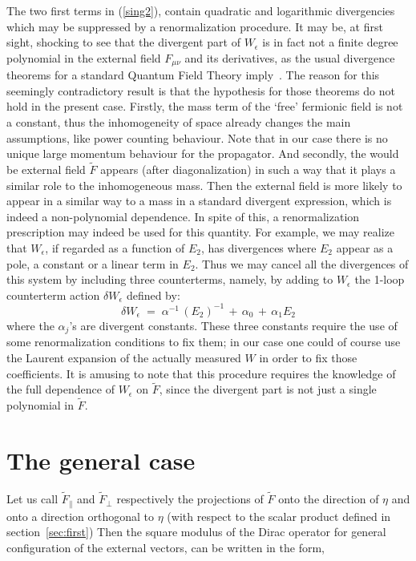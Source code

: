 \documentclass[a4paper,12pt]{article}
\newcommand{\Fd}{\widetilde{F}}
\newcommand{\n}{\eta}
\begin{document}
%

The two first terms in (\ref{sing2}), contain quadratic and
logarithmic divergencies which may be suppressed by a renormalization
procedure. It may be, at first sight, shocking to see that the
divergent part of $W_\epsilon$ is in fact not a finite degree polynomial in
the external field $F_{\mu\nu}$ and its derivatives, as the usual
divergence theorems for a standard Quantum Field Theory
imply~\cite{itzykson}. The reason for this seemingly contradictory
result is that the hypothesis for those theorems do not hold in the
present case. Firstly, the mass term of the `free' fermionic field is
not a constant, thus the inhomogeneity of space already changes the
main assumptions, like power counting behaviour. Note that in our case
there is no unique large momentum behaviour for the propagator.  And
secondly, the would be external field ${\tilde F}$ appears (after
diagonalization) in such a way that it plays a similar role to the
inhomogeneous mass. Then the external field is more likely to appear
in a similar way to a mass in a standard divergent expression, which
is indeed a non-polynomial dependence.
%
In spite of this, a renormalization prescription may indeed be used for this 
quantity. For example, we may realize that $W_\epsilon$, if regarded as a function of 
$E_2$, has divergences where $E_2$ appear as a pole, a constant or a linear term
in $E_2$. Thus we may cancel all the divergences of this system by including
three counterterms, namely, by adding to $W_\epsilon$ the 1-loop counterterm action
$\delta W_\epsilon$ defined by:
\begin{equation}
  \label{counter}
\delta W_\epsilon \;=\; \alpha^{-1} \, (E_2)^{-1} \,+\, \alpha_0 \,+\, \alpha_1 E_2  
\end{equation}   
where the $\alpha_j$'s are divergent constants. These three constants
require the use of some renormalization conditions to fix them; in our
case one could of course use the Laurent expansion of the actually
measured $W$ in order to fix those coefficients. It is amusing to
note that this procedure requires the knowledge of the full dependence
of $W_\epsilon$ on $\tilde{F}$, since the divergent part is not just a single
polynomial in $\tilde{F}$.

\section{The general case}\label{sec:general}
Let us call $\Fd_\|$ and $\Fd_\bot$ respectively the projections of $\Fd$
onto the direction of $\n$ and onto a direction orthogonal to $\n$
(with respect to the scalar product defined in
section~\ref{sec:first}) Then the square modulus of the Dirac operator
for general configuration of the external vectors, can be written in
the form,
\end{document}
